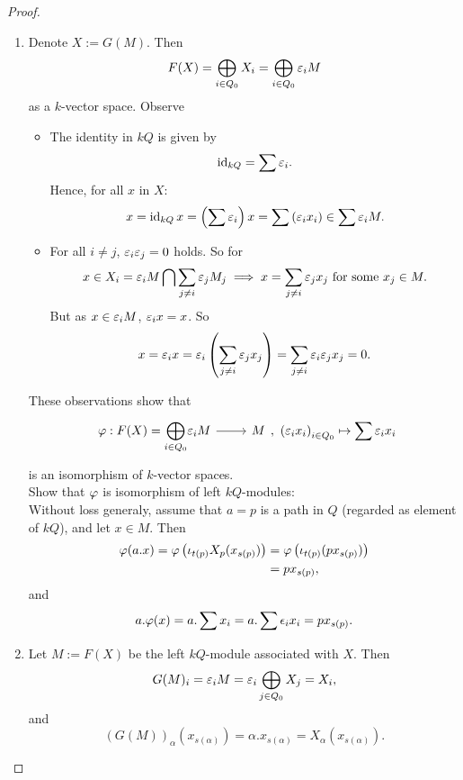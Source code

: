 \begin{proof}
  \begin{enumerate}
    \item Denote $X:=G(M)$. Then
    \[
    F(X) = \bigoplus_{i\in Q_0}X_i = \bigoplus_{i\in Q_0}\varepsilon_iM
    \]
    as a $k$-vector space. Observe
    \begin{itemize}
      \item The identity in $kQ$ is given by
      \[
      \operatorname{id}_{kQ} = \sum \varepsilon_i.
      \]
      Hence, for all $x$ in $X$:
      \[
      x = \operatorname{id}_{kQ}x = \left(\sum \varepsilon_i\right)x = \sum\left(\varepsilon_ix_i\right)\in \sum \varepsilon_iM.
      \]
      \item For all $i\neq j$, $\varepsilon_i\varepsilon_j=0$ holds. So for
      \[
      x\in X_i=\varepsilon_iM\bigcap \sum_{j\neq i}\varepsilon_jM_j\implies x = \sum_{j\neq i} \varepsilon_jx_j\text{ for some }x_j\in M.
      \]
      But as $x\in \varepsilon_iM$, $\varepsilon_ix=x$. So
      \[
      x=\varepsilon_ix=\varepsilon_i\left(\sum_{j\neq i}\varepsilon_jx_j\right)=\sum_{j\neq i}\varepsilon_i\varepsilon_j x_j = 0.
      \]
    \end{itemize}
    These observations show that
    \[
    \begin{tikzcd}
    \pphi:F(X)={\displaystyle\bigoplus_{i\in Q_0}}\eepsilon_iM\ar{r}& M\end{tikzcd},~\left(\eepsilon_ix_i\right)_{i\in Q_0}\mapsto \sum \eepsilon_ix_i
    \]
    is an isomorphism of $k$-vector spaces. \\
    Show that $\varphi$ is isomorphism of left $kQ$-modules:\\
    Without loss generaly, assume that $a=p$ is a path in $Q$ (regarded as element of $kQ$), and let $x\in M$. Then
    \begin{align*}
      \varphi(a.x) = \varphi\left(\iota_{t(p)}X_p(x_{s(p)})\right) &= \varphi\left(\iota_{t(p)}(px_{s(p)})\right)\\
      &= px_{s(p)},
    \end{align*}
    and
    \begin{align*}
      a.\varphi(x)= a.\sum x_i = a. \sum \epsilon_ix_i = px_{s(p)}.
    \end{align*}
  \item Let $M:= F(X)$ be the left $kQ$-module associated with $X$. Then
  \[
  G(M)_i = \varepsilon_iM = \varepsilon_i \bigoplus_{j\in Q_0}X_j = X_i,
  \]
  and
  \[
  \left( G(M)\right)_{\alpha}(x_{s(\alpha)}) = \alpha.x_{s(\alpha)} = X_{\alpha}(x_{s(\alpha)}).
  \]
  \end{enumerate}
\end{proof}


